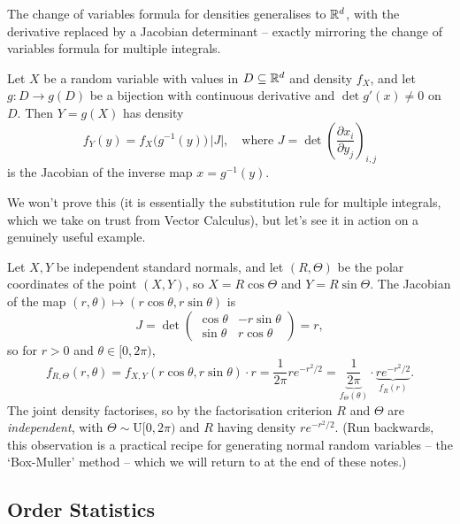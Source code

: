 \documentclass[a4paper]{scrartcl}
\begin{document}
The change of variables formula for densities generalises to $\mathbb{R}^d$, with the derivative replaced by a Jacobian determinant -- exactly mirroring the change of variables formula for multiple integrals.

\begin{theorem}
	Let $X$ be a random variable with values in $D \subseteq \mathbb{R}^d$ and density $f_X$, and let $g: D \rightarrow g(D)$ be a bijection with continuous derivative and $\det g'(x) \neq 0$ on $D$. Then $Y = g(X)$ has density
	$$
	f_Y(y) = f_X\big(g^{-1}(y)\big) \, |J|, \quad \text{where } J = \det\left(\frac{\partial x_i}{\partial y_j}\right)_{i, j}
	$$
	is the Jacobian of the inverse map $x = g^{-1}(y)$.
\end{theorem}

We won't prove this (it is essentially the substitution rule for multiple integrals, which we take on trust from Vector Calculus), but let's see it in action on a genuinely useful example.

\begin{example}
	Let $X, Y$ be independent standard normals, and let $(R, \Theta)$ be the polar coordinates of the point $(X, Y)$, so $X = R\cos\Theta$ and $Y = R\sin\Theta$. The Jacobian of the map $(r, \theta) \mapsto (r\cos\theta, r\sin\theta)$ is
	$$
	J = \det \begin{pmatrix}
		\cos\theta & -r\sin\theta \\ \sin\theta & r \cos\theta
	\end{pmatrix} = r,
	$$
	so for $r > 0$ and $\theta \in [0, 2\pi)$,
	$$
	f_{R, \Theta}(r, \theta) = f_{X,Y}(r\cos\theta, r\sin\theta) \cdot r = \frac{1}{2\pi} r e^{-r^2/2} = \underbrace{\frac{1}{2\pi}}_{f_\Theta(\theta)} \cdot \underbrace{r e^{-r^2/2}}_{f_R(r)}.
	$$
	The joint density factorises, so by the factorisation criterion $R$ and $\Theta$ are \emph{independent}, with $\Theta \sim \mathrm{U}[0, 2\pi)$ and $R$ having density $re^{-r^2/2}$. (Run backwards, this observation is a practical recipe for generating normal random variables -- the `Box-Muller' method -- which we will return to at the end of these notes.)
\end{example}

\subsection{Order Statistics}
\end{document}

